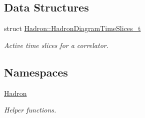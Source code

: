 \subsection*{Data Structures}
\begin{DoxyCompactItemize}
\item 
struct \mbox{\hyperlink{structHadron_1_1HadronDiagramTimeSlices__t}{Hadron\+::\+Hadron\+Diagram\+Time\+Slices\+\_\+t}}
\begin{DoxyCompactList}\small\item\em Active time slices for a correlator. \end{DoxyCompactList}\end{DoxyCompactItemize}
\subsection*{Namespaces}
\begin{DoxyCompactItemize}
\item 
 \mbox{\hyperlink{namespaceHadron}{Hadron}}
\begin{DoxyCompactList}\small\item\em Helper functions. \end{DoxyCompactList}\end{DoxyCompactItemize}
